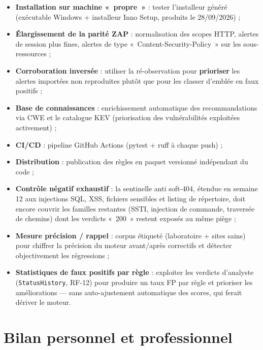 \documentclass[11pt,a4paper]{report}
\newcommand{\code}[1]{\texttt{#1}}
\begin{document}
\begin{itemize}[leftmargin=1.5em]
  \item \textbf{Installation sur machine «~propre~»} : tester l'installeur généré
        (exécutable Windows + installeur Inno Setup, produits le 28/09/2026) ;
  \item \textbf{Élargissement de la parité ZAP} : normalisation des scopes HTTP, alertes
        de session plus fines, alertes de type «~Content-Security-Policy~» sur les
        sous-ressources ;
  \item \textbf{Corroboration inversée} : utiliser la ré-observation pour
        \textbf{prioriser} les alertes importées non reproduites plutôt que pour les
        classer d'emblée en faux positifs ;
  \item \textbf{Base de connaissances} : enrichissement automatique des recommandations
        via CWE et le catalogue KEV (priorisation des vulnérabilités exploitées
        activement) ;
  \item \textbf{CI/CD} : pipeline GitHub Actions (pytest + ruff à chaque push) ;
  \item \textbf{Distribution} : publication des règles en paquet versionné indépendant du
        code ;
  \item \textbf{Contrôle négatif exhaustif} : la sentinelle anti soft-404, étendue en
        semaine 12 aux injections SQL, XSS, fichiers sensibles et listing de répertoire,
        doit encore couvrir les familles restantes (SSTI, injection de commande,
        traversée de chemins) dont les verdicts «~200~» restent exposés au même piège ;
  \item \textbf{Mesure précision / rappel} : corpus étiqueté (laboratoire + sites sains)
        pour chiffrer la précision du moteur avant/après correctifs et détecter
        objectivement les régressions ;
  \item \textbf{Statistiques de faux positifs par règle} : exploiter les verdicts
        d'analyste (\code{StatusHistory}, RF-12) pour produire un taux FP par règle et
        prioriser les améliorations --- sans auto-ajustement automatique des scores, qui
        ferait dériver le moteur.
\end{itemize}

\chapter{Bilan personnel et professionnel}
\end{document}
